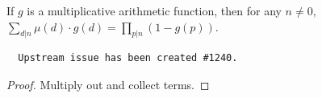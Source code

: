 \begin{theorem}
\label{sum_moebius_pmul_eq_prod_one_sub}
\leanok
If $g$ is a multiplicative arithmetic function, then for any $n \neq 0$,
    $\sum_{d | n} \mu(d) \cdot g(d) = \prod_{p | n} (1 - g(p))$.
      \begin{verbatim}
  Upstream issue has been created #1240.
  \end{verbatim}
\end{theorem}
\begin{proof}
\leanok
Multiply out and collect terms.
\end{proof}
